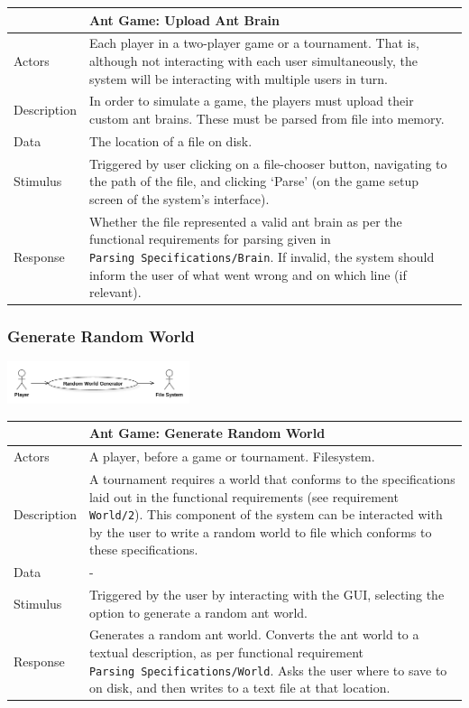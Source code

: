 \documentclass[11pt]{article}
\begin{document}
\begin{longtable}[c]{@{}p{}p{}@{}}
\toprule
& Ant Game: Upload Ant Brain\tabularnewline
\midrule

Actors & Each player in a two-player game or a tournament. That is,
although not interacting with each user simultaneously, the system will
be interacting with multiple users in turn.\tabularnewline
Description & In order to simulate a game, the players must upload their
custom ant brains. These must be parsed from file into
memory.\tabularnewline
Data & The location of a file on disk.\tabularnewline
Stimulus & Triggered by user clicking on a file-chooser button,
navigating to the path of the file, and clicking `Parse' (on the game
setup screen of the system's interface).\tabularnewline
Response & Whether the file represented a valid ant brain as per the
functional requirements for parsing given in
\texttt{Parsing\ Specifications/Brain}. If invalid, the system should
inform the user of what went wrong and on which line (if
relevant).\tabularnewline
\bottomrule
\end{longtable}

\subsubsection{Generate Random World}\label{generate-random-world}

\begin{center}
\includegraphics[width=0.4\textwidth]{high-level-diagrams/use-case-2-generate-random-world.png}
\end{center}

\begin{longtable}[c]{@{}p{}p{}@{}}
\toprule
& Ant Game: Generate Random World\tabularnewline
\midrule

Actors & A player, before a game or tournament.
Filesystem.\tabularnewline
Description & A tournament requires a world that conforms to the
specifications laid out in the functional requirements (see requirement
\texttt{World/2}). This component of the system can be interacted with
by the user to write a random world to file which conforms to these
specifications.\tabularnewline
Data & -\tabularnewline
Stimulus & Triggered by the user by interacting with the GUI, selecting
the option to generate a random ant world.\tabularnewline
Response & Generates a random ant world. Converts the ant world to a
textual description, as per functional requirement
\texttt{Parsing\ Specifications/World}. Asks the user where to save to
on disk, and then writes to a text file at that location.\tabularnewline
\bottomrule
\end{longtable}
\end{document}
